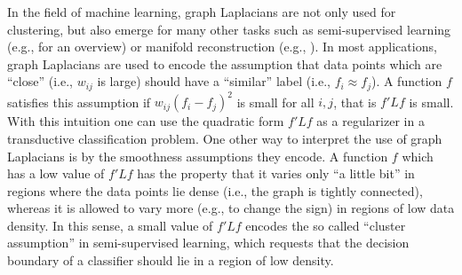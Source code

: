 \documentclass{article}
\newcommand{\Lun}{L}
\begin{document}
In the field of machine learning, graph Laplacians are not only used
for clustering, but also emerge for many other tasks such as
semi-supervised learning (e.g.,  for an overview)
or manifold reconstruction (e.g., ). In most
applications, graph Laplacians are used to encode the assumption that
data points which are ``close'' (i.e., $w_{ij}$ is large) should have
a ``similar'' label (i.e., $f_i \approx f_j$). A function $f$
satisfies this assumption if $w_{ij}(f_i - f_j)^2$ is small for all
$i,j$, that is $f'\Lun f$ is small. With this intuition one can use
the quadratic form $f'\Lun f$ as a regularizer in a transductive
classification problem. One other way to interpret the use of graph
Laplacians is by the smoothness assumptions they encode.  A function
$f$ which has a low value of $f'\Lun f$ has the property that it
varies only ``a little bit'' in regions where the data points lie
dense (i.e., the graph is tightly connected), whereas it is allowed to
vary more (e.g., to change the sign) in regions of low data density.
In this sense, a small value of $f'\Lun f$ encodes the so called
``cluster assumption'' in semi-supervised learning, which requests
that the decision boundary of a
classifier should lie in a region of low density. \\
\end{document}
